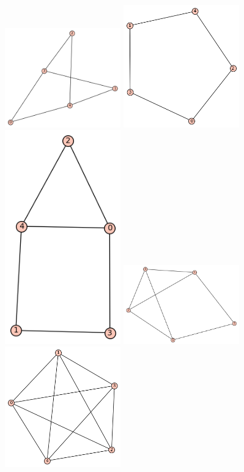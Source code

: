 \documentclass[10pt, a4paper]{article}
\begin{document}
\includegraphics[width=5cm]{min_graf_5.1}
\includegraphics[width=5cm]{min_graf_5.2}
\includegraphics[width=5cm]{min_graf_5.3}
\includegraphics[width=5cm]{min_graf_5.4}
\includegraphics[width=5cm]{min_graf_5.5}
\end{document}
